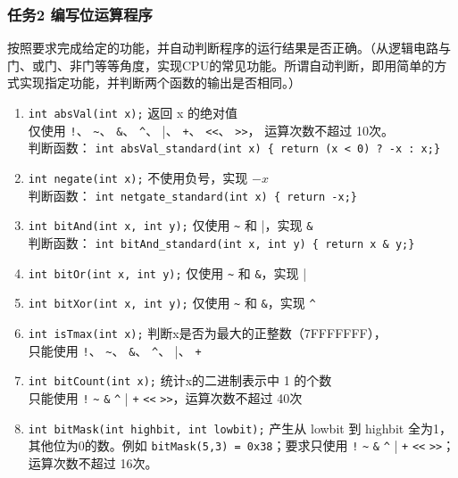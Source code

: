 \documentclass[supercite]{Experimental_Report}
\theoremstyle{definition}
\begin{document}
	\subsubsection*{任务2 编写位运算程序}
	按照要求完成给定的功能，并自动判断程序的运行结果是否正确。（从逻辑电路与门、或门、非门等等角度，实现CPU的常见功能。所谓自动判断，即用简单的方式实现指定功能，并判断两个函数的输出是否相同。）
	
	\begin{enumerate}
		\item \texttt{int absVal(int x);} 返回 x 的绝对值 \\
		仅使用 \verb|!|、 \verb|~|、 \verb|&|、 \verb|^|、 \verb|||、 \verb|+|、 \verb|<<|、 \verb|>>|， 运算次数不超过 10次。\\
		判断函数： \texttt{int absVal\_standard(int x) \{ return (x < 0) ? -x : x;\}}
		
		\item \texttt{int negate(int x);} 不使用负号，实现 $-x$ \\
		判断函数： \texttt{int netgate\_standard(int x) \{ return -x;\}}
		
		\item \texttt{int bitAnd(int x, int y);} 仅使用 \verb|~| 和 \verb|||，实现 \verb|&| \\
		判断函数： \texttt{int bitAnd\_standard(int x, int y) \{ return x \& y;\}}
		
		\item \texttt{int bitOr(int x, int y);} 仅使用 \verb|~| 和 \verb|&|，实现 \verb|||
		
		\item \texttt{int bitXor(int x, int y);} 仅使用 \verb|~| 和 \verb|&|，实现 \verb|^|
		
		\item \texttt{int isTmax(int x);} 判断x是否为最大的正整数（7FFFFFFF），\\
		只能使用 \verb|!|、 \verb|~|、 \verb|&|、 \verb|^|、 \verb|||、 \verb|+|
		
		\item \texttt{int bitCount(int x);} 统计x的二进制表示中 1 的个数 \\
		只能使用 \verb|!| \verb|~| \verb|&| \verb|^| \verb||| \verb|+| \verb|<<| \verb|>>|，运算次数不超过 40次
		
		\item \texttt{int bitMask(int highbit, int lowbit);} 产生从 lowbit 到 highbit 全为1，其他位为0的数。例如 \texttt{bitMask(5,3) = 0x38}；要求只使用 \verb|!| \verb|~| \verb|&| \verb|^| \verb||| \verb|+| \verb|<<| \verb|>>|；运算次数不超过 16次。
		

\end{enumerate}
\end{document}
